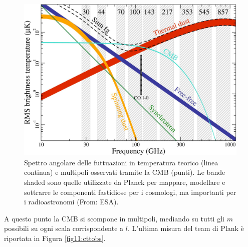 \begin{figure}[H]
    \centering
    \includegraphics[width=0.65 \textwidth]{Pictures/11/falsecmb.jpg}
    \caption{Spettro angolare delle futtuazioni in temperatura teorico (linea continua) e multipoli osservati tramite la CMB (punti). Le bande shaded sono quelle utilizzate da Planck per mappare, modellare e sottrarre le componenti fastidiose per i cosmologi, ma importanti per i radioastronomi (From: ESA).}\label{fig11:cmbsporca}
\end{figure}

A questo punto la CMB si scompone in multipoli, mediando su tutti gli $m$ possibili su ogni scala corrispondente a $l$. L'ultima misura del team di Plank è riportata in Figura \ref{fig11:cttobs}. 


